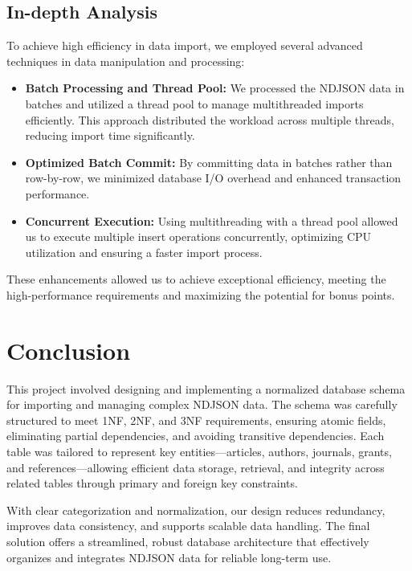 \documentclass{article}
\begin{document}
\subsection{In-depth Analysis}
To achieve high efficiency in data import, we employed several advanced techniques in data manipulation and processing:
\begin{itemize}
\item \textbf{Batch Processing and Thread Pool:} We processed the NDJSON data in batches and utilized a thread pool to manage multithreaded imports efficiently. This approach distributed the workload across multiple threads, reducing import time significantly.
\item \textbf{Optimized Batch Commit:} By committing data in batches rather than row-by-row, we minimized database I/O overhead and enhanced transaction performance.
\item \textbf{Concurrent Execution:} Using multithreading with a thread pool allowed us to execute multiple insert operations concurrently, optimizing CPU utilization and ensuring a faster import process.
\end{itemize}



These enhancements allowed us to achieve exceptional efficiency, meeting the high-performance requirements and maximizing the potential for bonus points.
\section{Conclusion}
This project involved designing and implementing a normalized database schema for importing and managing complex NDJSON data. The schema was carefully structured to meet 1NF, 2NF, and 3NF requirements, ensuring atomic fields, eliminating partial dependencies, and avoiding transitive dependencies. Each table was tailored to represent key entities—articles, authors, journals, grants, and references—allowing efficient data storage, retrieval, and integrity across related tables through primary and foreign key constraints.

With clear categorization and normalization, our design reduces redundancy, improves data consistency, and supports scalable data handling. The final solution offers a streamlined, robust database architecture that effectively organizes and integrates NDJSON data for reliable long-term use.




\end{document}

